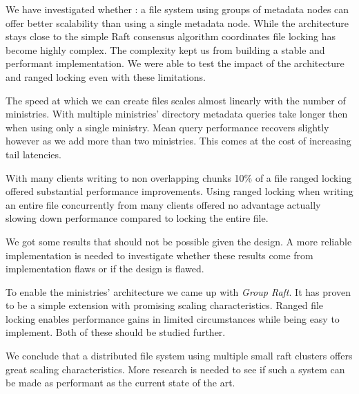 We have investigated whether \name{}: a file system using groups of metadata nodes can offer better scalability than using a single metadata node. While the architecture stays close to the simple Raft consensus algorithm coordinates file locking has become highly complex. The complexity kept us from building a stable and performant implementation. We were able to test the impact of the architecture and ranged locking even with these limitations.

The speed at which we can create files scales almost linearly with the number of ministries. With multiple ministries' directory metadata queries take longer then when using only a single ministry. Mean query performance recovers slightly however as we add more than two ministries. This comes at the cost of increasing tail latencies.

With many clients writing to non overlapping chunks 10\% of a file ranged locking offered substantial performance improvements. Using ranged locking when writing an entire file concurrently from many clients offered no advantage actually slowing down performance compared to locking the entire file.

We got some results that should not be possible given the design. A more reliable implementation is needed to investigate whether these results come from implementation flaws or if the design is flawed. 

To enable the ministries' architecture we came up with \textit{Group Raft}. It has proven to be a simple extension with promising scaling characteristics. Ranged file locking enables performance gains in limited circumstances while being easy to implement. Both of these should be studied further. 

We conclude that a distributed file system using multiple small raft clusters offers great scaling characteristics. More research is needed to see if such a system can be made as performant as the current state of the art.
